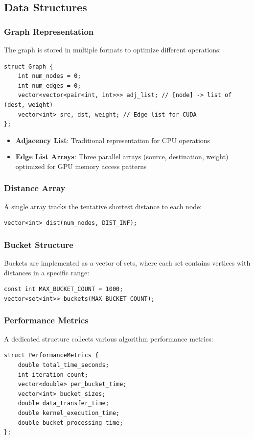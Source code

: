 \documentclass{article}
\begin{document}
\subsection*{Data Structures}

\subsubsection*{Graph Representation}
The graph is stored in multiple formats to optimize different operations:

\begin{verbatim}
struct Graph {
    int num_nodes = 0;
    int num_edges = 0;
    vector<vector<pair<int, int>>> adj_list; // [node] -> list of (dest, weight)
    vector<int> src, dst, weight; // Edge list for CUDA
};
\end{verbatim}

\begin{itemize}
    \item \textbf{Adjacency List}: Traditional representation for CPU operations
    \item \textbf{Edge List Arrays}: Three parallel arrays (source, destination, weight) optimized for GPU memory access patterns
\end{itemize}

\subsubsection*{Distance Array}
A single array tracks the tentative shortest distance to each node:
\begin{verbatim}
vector<int> dist(num_nodes, DIST_INF);
\end{verbatim}

\subsubsection*{Bucket Structure}
Buckets are implemented as a vector of sets, where each set contains vertices with distances in a specific range:
\begin{verbatim}
const int MAX_BUCKET_COUNT = 1000;
vector<set<int>> buckets(MAX_BUCKET_COUNT);
\end{verbatim}

\subsubsection*{Performance Metrics}
A dedicated structure collects various algorithm performance metrics:
\begin{verbatim}
struct PerformanceMetrics {
    double total_time_seconds;
    int iteration_count;
    vector<double> per_bucket_time;
    vector<int> bucket_sizes;
    double data_transfer_time;
    double kernel_execution_time;
    double bucket_processing_time;
};
\end{verbatim}
\end{document}
